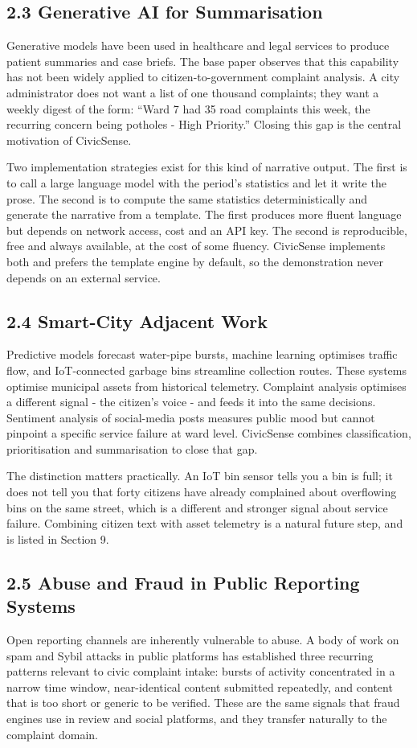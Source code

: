 \documentclass[10pt,letterpaper,oneside]{article}\usepackage{geometry}\geometry{top=1in,bottom=1in,left=1in,right=1in,includeheadfoot}\usepackage{xcolor}\definecolor{color@navy}{HTML}{1F3B63}\definecolor{color@grey}{HTML}{404040}\definecolor{color@hdr}{HTML}{F2F4F7}\usepackage{titlesec}\titleformat{\section}  {\normalfont\huge\bfseries\color@navy}  {}{0pt}{\MakeUppercase}\titleformat{\subsection}  {\normalfont\Large\bfseries\color@navy}  {}{0pt}{}\titleformat{\subsubsection}  {\normalfont\large\bfseries\color@navy}  {}{0pt}{}\titlespacing*{\section}{0pt}{14pt}{6pt}\titlespacing*{\subsection}{0pt}{10pt}{4pt}\titlespacing*{\subsubsection}{0pt}{8pt}{3pt}\setlength{\parindent}{0pt}\setlength{\parskip}{0.6em}\parindent=0pt\usepackage{enumitem}\setlist{nosep,leftmargin=*,itemsep=0pt,topsep=2pt,partopsep=0pt}\usepackage{array}\usepackage{booktabs}\usepackage{caption}\captionsetup{font={small,it},labelfont={bf},labelsep=period,  parskip=2pt,skip=4pt,list=no}\captionsetup[table]{labelfont={bf,small,color@navy},name=Table}\usepackage{graphicx}\usepackage{verbatim}\usepackage{ragged2e}\usepackage{longtable}\usepackage{tabularx}\usepackage{multirow}\usepackage{colortbl}\definecolor{rowshade}{HTML}{F2F4F7}\usepackage{tikz}\usetikzlibrary{positioning,calc}\usepackage[hidelinks]{hyperref}\hypersetup{colorlinks=true,linkcolor=color@navy,urlcolor=color@navy}\pagestyle{fancy}\fancyhf{}\renewcommand{\headrulewidth}{0.4pt}\fancyhead[L]{\small\color@navy CivicSense — Project Report}\fancyhead[R]{\small\color@grey October 11, 2026}\fancyfoot[C]{\small\color@grey An Integrated Intelligent Triage Pipelin}\fancyfoot[R]{\small\color@grey Page \thepage}\usepackage{setspace}\setstretch{1.15}\AtBeginDocument{  \hypersetup{pdftitle={An Integrated Intelligent Triage Pipeline for AI-Enhanced Citizen Complaint Management},    pdfauthor={CivicSense Project Team},    pdfsubject={Project Report},    pdfkeywords={smart cities, NLP, complaint management, e-governance},    pdfcreator={CivicSense Project Team}  }}
\begin{document}
\subsection*{2.3 Generative AI for Summarisation}
Generative models have been used in healthcare and legal services to produce patient summaries and case briefs. The base paper observes that this capability has not been widely applied to citizen-to-government complaint analysis. A city administrator does not want a list of one thousand complaints; they want a weekly digest of the form: “Ward 7 had 35 road complaints this week, the recurring concern being potholes - High Priority.” Closing this gap is the central motivation of CivicSense.

Two implementation strategies exist for this kind of narrative output. The first is to call a large language model with the period’s statistics and let it write the prose. The second is to compute the same statistics deterministically and generate the narrative from a template. The first produces more fluent language but depends on network access, cost and an API key. The second is reproducible, free and always available, at the cost of some fluency. CivicSense implements both and prefers the template engine by default, so the demonstration never depends on an external service.

\subsection*{2.4 Smart-City Adjacent Work}
Predictive models forecast water-pipe bursts, machine learning optimises traffic flow, and IoT-connected garbage bins streamline collection routes. These systems optimise municipal assets from historical telemetry. Complaint analysis optimises a different signal - the citizen’s voice - and feeds it into the same decisions. Sentiment analysis of social-media posts measures public mood but cannot pinpoint a specific service failure at ward level. CivicSense combines classification, prioritisation and summarisation to close that gap.

The distinction matters practically. An IoT bin sensor tells you a bin is full; it does not tell you that forty citizens have already complained about overflowing bins on the same street, which is a different and stronger signal about service failure. Combining citizen text with asset telemetry is a natural future step, and is listed in Section 9.

\subsection*{2.5 Abuse and Fraud in Public Reporting Systems}
Open reporting channels are inherently vulnerable to abuse. A body of work on spam and Sybil attacks in public platforms has established three recurring patterns relevant to civic complaint intake: bursts of activity concentrated in a narrow time window, near-identical content submitted repeatedly, and content that is too short or generic to be verified. These are the same signals that fraud engines use in review and social platforms, and they transfer naturally to the complaint domain.
\end{document}
